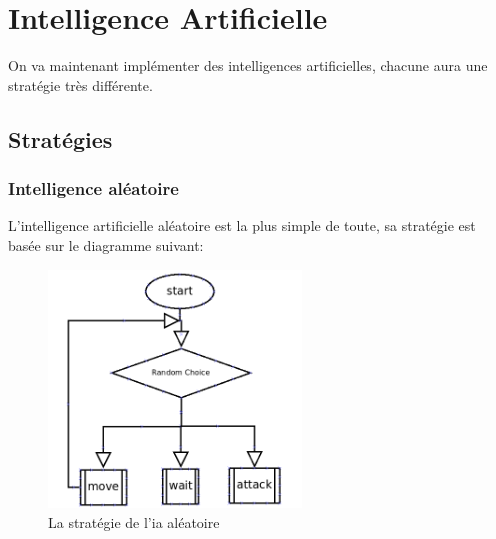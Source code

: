 \documentclass[a4paper,12pt]{article}
\begin{document}
\section{Intelligence Artificielle}

On va maintenant implémenter des intelligences artificielles, chacune aura une stratégie très différente.

\subsection{Stratégies}
\subsubsection{Intelligence aléatoire}

L'intelligence artificielle aléatoire est la plus simple de toute, sa stratégie est basée sur le diagramme suivant:
\begin{figure}[ht]
\begin{center}
\includegraphics[width=0.6\textwidth]{iaRandomDiagram.png}
\caption{\label{pacmangame}La stratégie de l'ia aléatoire}
\end{center}
\end{figure}
\end{document}
